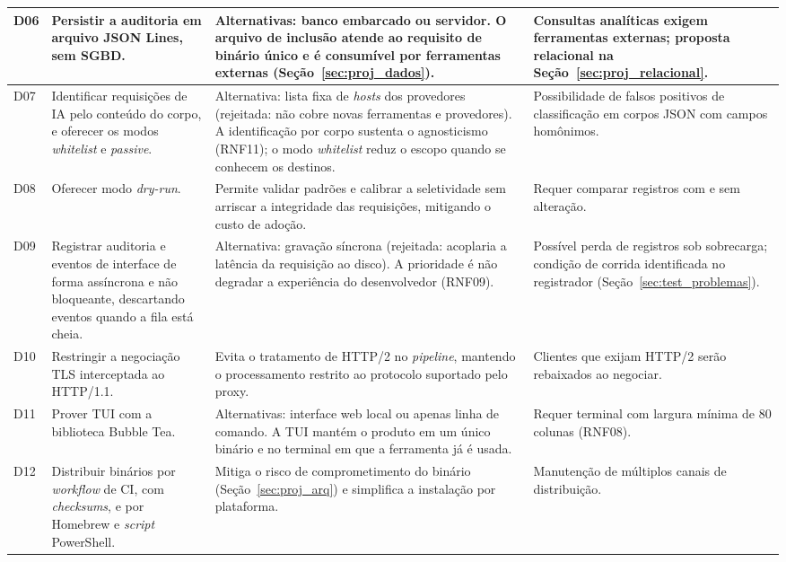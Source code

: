 {\begin{longtable}{|p{1.0cm}|p{4.2cm}|p{5.4cm}|p{3.3cm}|}
D06  & Persistir a auditoria em arquivo JSON Lines, sem SGBD. & Alternativas: banco embarcado ou servidor. O arquivo de inclusão atende ao requisito de binário único e é consumível por ferramentas externas (Seção~\ref{sec:proj_dados}). & Consultas analíticas exigem ferramentas externas; proposta relacional na Seção~\ref{sec:proj_relacional}. \\ \hline
D07  & Identificar requisições de IA pelo conteúdo do corpo, e oferecer os modos \textit{whitelist} e \textit{passive}. & Alternativa: lista fixa de \textit{hosts} dos provedores (rejeitada: não cobre novas ferramentas e provedores). A identificação por corpo sustenta o agnosticismo (RNF11); o modo \textit{whitelist} reduz o escopo quando se conhecem os destinos. & Possibilidade de falsos positivos de classificação em corpos JSON com campos homônimos. \\ \hline
D08 & Oferecer modo \textit{dry-run}. & Permite validar padrões e calibrar a seletividade sem arriscar a integridade das requisições, mitigando o custo de adoção. & Requer comparar registros com e sem alteração. \\ \hline
D09  & Registrar auditoria e eventos de interface de forma assíncrona e não bloqueante, descartando eventos quando a fila está cheia. & Alternativa: gravação síncrona (rejeitada: acoplaria a latência da requisição ao disco). A prioridade é não degradar a experiência do desenvolvedor (RNF09). & Possível perda de registros sob sobrecarga; condição de corrida identificada no registrador (Seção~\ref{sec:test_problemas}). \\ \hline
D10  & Restringir a negociação TLS interceptada ao HTTP/1.1. & Evita o tratamento de HTTP/2 no \textit{pipeline}, mantendo o processamento restrito ao protocolo suportado pelo proxy. & Clientes que exijam HTTP/2 serão rebaixados ao negociar. \\ \hline
D11  & Prover TUI com a biblioteca Bubble Tea. & Alternativas: interface web local ou apenas linha de comando. A TUI mantém o produto em um único binário e no terminal em que a ferramenta já é usada. & Requer terminal com largura mínima de 80 colunas (RNF08). \\ \hline
D12  & Distribuir binários por \textit{workflow} de CI, com \textit{checksums}, e por Homebrew e \textit{script} PowerShell. & Mitiga o risco de comprometimento do binário (Seção~\ref{sec:proj_arq}) e simplifica a instalação por plataforma. & Manutenção de múltiplos canais de distribuição. \\ \hline
\end{longtable}
}
\noindent{}

